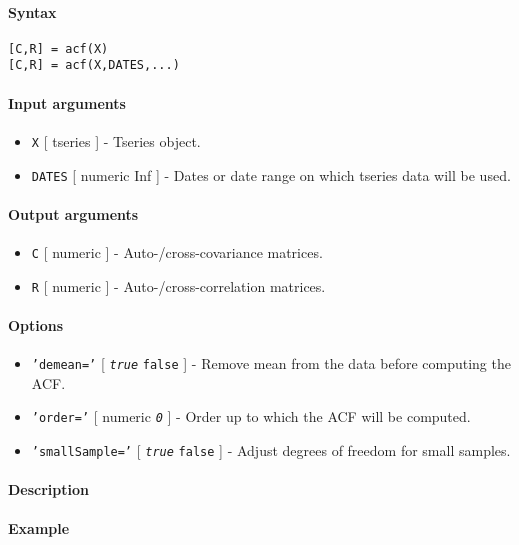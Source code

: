 


	\paragraph{Syntax}\label{syntax}

\begin{verbatim}
[C,R] = acf(X)
[C,R] = acf(X,DATES,...)
\end{verbatim}

\paragraph{Input arguments}\label{input-arguments}

\begin{itemize}
\item
  \texttt{X} {[} tseries {]} - Tseries object.
\item
  \texttt{DATES} {[} numeric \textbar{} Inf {]} - Dates or date range on
  which tseries data will be used.
\end{itemize}

\paragraph{Output arguments}\label{output-arguments}

\begin{itemize}
\item
  \texttt{C} {[} numeric {]} - Auto-/cross-covariance matrices.
\item
  \texttt{R} {[} numeric {]} - Auto-/cross-correlation matrices.
\end{itemize}

\paragraph{Options}\label{options}

\begin{itemize}
\item
  \texttt{'demean='} {[} \emph{\texttt{true}} \textbar{} \texttt{false}
  {]} - Remove mean from the data before computing the ACF.
\item
  \texttt{'order='} {[} numeric \textbar{} \emph{\texttt{0}} {]} - Order
  up to which the ACF will be computed.
\item
  \texttt{'smallSample='} {[} \emph{\texttt{true}} \textbar{}
  \texttt{false} {]} - Adjust degrees of freedom for small samples.
\end{itemize}

\paragraph{Description}\label{description}

\paragraph{Example}\label{example}


